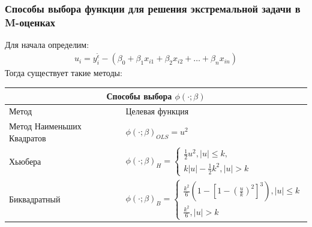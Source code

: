 \documentclass[12pt]{article}
\begin{document}
\subsubsection{Способы выбора  функции для решения экстремальной задачи в M-оценках}
Для начала определим:
\begin{eqnarray}
    u_i=y_i^{\widetilde{\epsilon}}-(\beta_0+\beta_1 x_{i1}+\beta_2 x_{i2}+\dots+\beta_n x_{in})
\end{eqnarray}
Тогда существует такие методы\cite{RobustRegression}:\hfill\break
\begin{center}
\begin{tabular}{ |p{3cm}|p{10cm} | }
    \hline
    \multicolumn{2}{|c|}{Способы выбора $\phi(\cdot;\beta)$} \\
    \hline
    Метод& Целевая функция\\
    \hline
    Метод Наименьших Квадратов&$\phi(\cdot;\beta)_{OLS}=u^2$\\
    Хьюбера&$\phi(\cdot;\beta)_{H}=
        \begin{cases}
            \frac{1}{2}u^2, |u|\leq k,\\
            k|u|-\frac{1}{2}k^2, |u|>k
        \end{cases}$\\
    Биквадратный& $\phi(\cdot;\beta)_{B}=
    \begin{cases}
        \frac{k^2}{6}(1-[1-(\frac{u}{k})^2]^3), |u|\leq k\\
        \frac{k^2}{6}, |u|>k
    \end{cases}$\\
    \hline
\end{tabular}
\end{center}
\newpage
\end{document}
